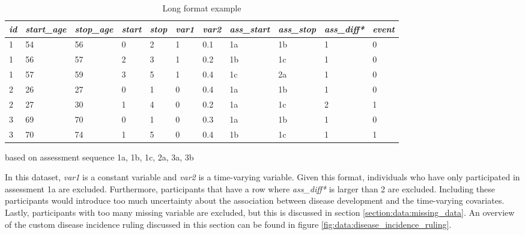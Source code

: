 \begin{table} [H]
    \centering
    \caption{Long format example}
    \begin{tabular}{|l|l|l|l|l|l|l|l|l|l|l|}
\hline
\textit{id} & \textit{start\_age} & \textit{stop\_age} & \textit{start} & \textit{stop} & \textit{var1} & \textit{var2} & \textit{ass\_start} & \textit{ass\_stop} & \textit{ass\_diff*} & \textit{event} \\ \hline
1  & 54         & 56        & 0     & 2    & 1    & 0.1  & 1a                & 1b               & 1                & 0     \\ \hline
1  & 56         & 57        & 2     & 3    & 1    & 0.2  & 1b                & 1c               & 1                & 0     \\ \hline
1  & 57         & 59        & 3     & 5    & 1    & 0.4  & 1c                & 2a               & 1                & 0     \\ \hline
2  & 26         & 27        & 0     & 1    & 0    & 0.4  & 1a                & 1b               & 1                & 0     \\ \hline
2  & 27         & 30        & 1     & 4    & 0    & 0.2  & 1a                & 1c               & 2                & 1     \\ \hline
3  & 69         & 70        & 0     & 1    & 0    & 0.3  & 1a                & 1b               & 1                & 0     \\ \hline
3  & 70         & 74        & 1     & 5    & 0    & 0.4  & 1b                & 1c               & 1                & 1     \\ \hline
    \end{tabular}
    \begin{tablenotes}
        \small
        \item* based on assessment sequence 1a, 1b, 1c, 2a, 3a, 3b
      \end{tablenotes}
    \label{table:data:example_long_format}
\end{table}

In this dataset, \textit{var1} is a constant variable and \textit{var2} is a time-varying variable. Given this format, individuals who have only participated in assessment 1a are excluded. Furthermore, participants that have a row where \textit{ass\_diff*} is larger than 2 are excluded. Including these participants would introduce too much uncertainty about the association between disease development and the time-varying covariates. Lastly, participants with too many missing variable are excluded, but this is discussed in section \ref{section:data:missing_data}. An overview of the custom disease incidence ruling discussed in this section can be found in figure \ref{fig:data:disease_incidence_ruling}.

